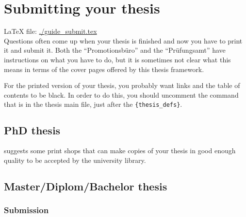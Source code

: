\chapter{Submitting your thesis}%
\label{sec:submit}

\LaTeX{} file: \url{./guide_submit.tex}\\[1ex]
\noindent
Questions often come up when your thesis is finished and now you have
to print it and submit it. Both the
\foreignquote{ngerman}{Promotionsbüro} and the
\foreignquote{ngerman}{Prüfungsamt} have instructions on what you have
to do, but it is sometimes not clear what this means in terms of the
cover pages offered by this thesis framework.

For the printed version of your thesis, you probably want
 links and the table of contents to be black. In
order to do this, you should uncomment the  command
that is in the thesis main file, just after the
\texttt{\{thesis\_defs\}}.


\section{PhD thesis}%
\label{sec:submit:phd}



 suggests some print shops that can make copies
of your thesis in good enough quality to be accepted by the university
library.


\section{Master/Diplom/Bachelor thesis}%
\label{sec:submit:other}

\subsection{Submission}

